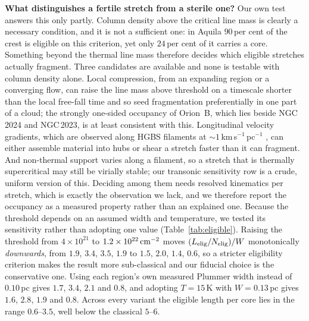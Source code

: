 \documentclass[usenatbib,twoside,twocolumn]{mnras}
\begin{document}
\smallskip\noindent\textbf{What distinguishes a fertile stretch from a sterile one?} Our own test answers this only partly. Column density above the critical line mass is clearly a necessary condition, and it is not a sufficient one: in Aquila $90$\,per cent of the crest is eligible on this criterion, yet only $24$\,per cent of it carries a core. Something beyond the thermal line mass therefore decides which eligible stretches actually fragment. Three candidates are available and none is testable with column density alone. Local compression, from an expanding  region or a converging flow, can raise the line mass above threshold on a timescale shorter than the local free-fall time and so seed fragmentation preferentially in one part of a cloud; the strongly one-sided occupancy of Orion~B, which lies beside NGC\,2024 and NGC\,2023, is at least consistent with this. Longitudinal velocity gradients, which are observed along HGBS filaments at $\sim1$\,km\,s$^{-1}$\,pc$^{-1}$ \citep{Kirk2013,Hacar2013}, can either assemble material into hubs or shear a stretch faster than it can fragment. And non-thermal support varies along a filament, so a stretch that is thermally supercritical may still be virially stable; our transonic sensitivity row is a crude, uniform version of this. Deciding among them needs resolved kinematics per stretch, which is exactly the observation we lack, and we therefore report the occupancy as a measured property rather than an explained one. Because the threshold depends on an assumed width and temperature, we tested its sensitivity rather than adopting one value (Table~\ref{tab:eligible}). Raising the threshold from $4\times10^{21}$ to $1.2\times10^{22}\,{\rm cm^{-2}}$ moves $(L_{\rm elig}/N_{\rm elig})/W$ monotonically \emph{downwards}, from $1.9$, $3.4$, $3.5$, $1.9$ to $1.5$, $2.0$, $1.4$, $0.6$, so a stricter eligibility criterion makes the result more sub-classical and our fiducial choice is the conservative one. Using each region's own measured Plummer width instead of $0.10$\,pc gives $1.7$, $3.4$, $2.1$ and $0.8$, and adopting $T=15$\,K with $W=0.13$\,pc gives $1.6$, $2.8$, $1.9$ and $0.8$. Across every variant the eligible length per core lies in the range $0.6$--$3.5$, well below the classical $5$--$6$.
\end{document}
